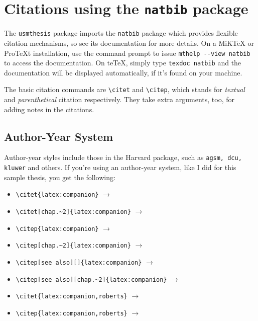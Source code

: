 \section{Citations using the \texttt{natbib} package}
The \verb|usmthesis| package imports the \verb|natbib| package which provides flexible citation mechanisms, so see its documentation for more details.  On a MiK\TeX{} or Pro\TeX{}t installation,
use the command prompt to issue \lstinline|mthelp --view natbib| to access the documentation.
On teTeX, simply type \verb|texdoc natbib| and the documentation will be displayed automatically, if it's found on your machine.

The basic citation commands are \verb|\citet| and \verb|\citep|, which stands for \emph{textual} and \emph{parenthetical} citation respectively.  They take extra arguments, too, for adding notes in the citations.  

\subsection{Author-Year System}
Author-year styles include those in the Harvard package, such as \texttt{agsm, dcu, kluwer} and others.
If you're using an author-year system, like I did for this sample thesis, you get the following:

\begin{itemize}[nosep]
\item \verb|\citet{latex:companion}| $\to$ \citet{latex:companion}
\item \verb|\citet[chap.~2]{latex:companion}| $\to$ \citet[chap.~2]{latex:companion}
\item \verb|\citep{latex:companion}| $\to$ \citep{latex:companion}
\item \verb|\citep[chap.~2]{latex:companion}| $\to$ \citep[chap.~2]{latex:companion}
\item \verb|\citep[see also][]{latex:companion}| $\to$ \citep[see also][]{latex:companion}
\item \verb|\citep[see also][chap.~2]{latex:companion}| $\to$ \citep[see also][chap.~2]{latex:companion}
\item \verb|\citet{latex:companion,roberts}| $\to$ \citet{latex:companion,roberts}
\item \verb|\citep{latex:companion,roberts}| $\to$ \citep{latex:companion,roberts}
\end{itemize}

